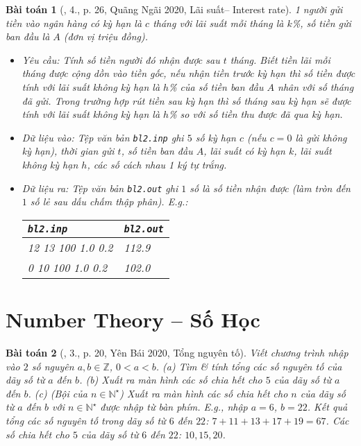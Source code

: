 \documentclass{article}
\newtheorem{baitoan}{Bài toán}
\begin{document}
\begin{baitoan}[\cite{VietSTEM2021}, 4., p. 26, Quãng Ngãi 2020, Lãi suất-- Interest rate]
	1 người gửi tiền vào ngân hàng có kỳ hạn là $c$ tháng với lãi suất mỗi tháng là $k$\emph{\%}, số tiền gửi ban đầu là $A$ (đơn vị triệu đồng). 
	\begin{itemize}
		\item {\sf Yêu cầu:} Tính số tiền người đó nhận được sau $t$ tháng. Biết tiền lãi mỗi tháng được cộng dồn vào tiền gốc, nếu nhận tiền trước kỳ hạn thì số tiền được tính với lãi suất không kỳ hạn là $h$\emph{\%} của số tiền ban đầu $A$ nhân với số tháng đã gửi. Trong trường hợp rút tiền sau kỳ hạn thì số tháng sau kỳ hạn sẽ được tính với lãi suất không kỳ hạn là $h$\emph{\%} so với số tiền thu được đã qua kỳ hạn.
		\item {\sf Dữ liệu vào:} Tệp văn bản \verb|bl2.inp| ghi $5$ số kỳ hạn $c$ (nếu $c = 0$ là gửi không kỳ hạn), thời gian gửi $t$, số tiền ban đầu $A$, lãi suất có kỳ hạn $k$, lãi suất không kỳ hạn $h$, các số cách nhau 1 ký tự trắng.
		\item {\sf Dữ liệu ra:} Tệp văn bản \verb|bl2.out| ghi $1$ số là số tiền nhận được (làm tròn đến $1$ số lẻ sau dấu chấm thập phân). E.g.:
		\begin{table}[H]
			\centering
			\begin{tabular}{|l|l|}
				\hline
				\texttt{bl2.inp} & \texttt{bl2.out} \\
				\hline
				12 13 100 1.0 0.2 & 112.9 \\
				\hline
				0 10 100 1.0 0.2 & 102.0 \\
				\hline
			\end{tabular}
		\end{table}
	\end{itemize}
\end{baitoan}


\section{Number Theory -- Số Học}

\begin{baitoan}[\cite{VietSTEM2021}, 3., p. 20, Yên Bái 2020, Tổng nguyên tố]
	Viết chương trình nhập vào $2$ số nguyên $a,b\in\mathbb{Z}$, $0 < a < b$. (a) Tìm \& tính tổng các số nguyên tố của dãy số từ $a$ đến $b$. (b) Xuất ra màn hình các số chia hết cho $5$ của dãy số từ $a$ đến $b$. (c) \emph{(Bội của $n\in\mathbb{N}^\star$)} Xuất ra màn hình các số chia hết cho $n$ của dãy số từ $a$ đến $b$ với $n\in\mathbb{N}^\star$ được nhập từ bàn phím. E.g., nhập $a = 6$, $b = 22$. Kết quả tổng các số nguyên tố trong dãy số từ $6$ đến $22$: $7 + 11 + 13 + 17 + 19 = 67$. Các số chia hết cho $5$ của dãy số từ $6$ đến $22$: $10,15,20$.
\end{baitoan}
\end{document}
